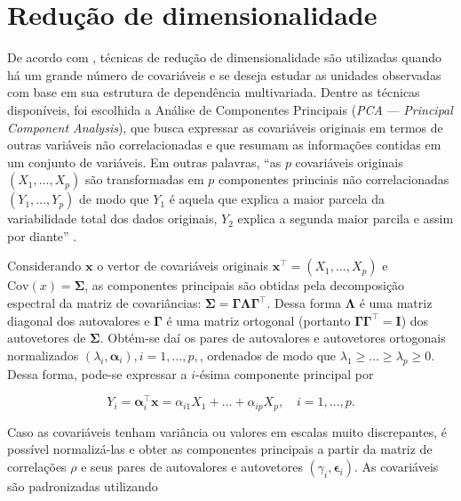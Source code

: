\documentclass[12pt, a4paper, twoside]{report}
\numberwithin{equation}{subsection} %
\begin{document}
 \section{Redução de dimensionalidade}
 
 De acordo com \cite{morettindatasci}, técnicas de redução de dimensionalidade são utilizadas quando há um grande número de covariáveis e se deseja estudar as unidades observadas com base em sua estrutura de dependência multivariada. Dentre as técnicas disponíveis, foi escolhida a Análise de Componentes Principais (\textit{PCA} --- \textit{Principal Component Analysis}), que busca expressar as covariáveis originais em termos de outras variáveis não correlacionadas e que resumam as informações contidas em um conjunto de variáveis. Em outras palavras, ``as $p$ covariáveis originais $(X_1, \dots , X_p)$ são transformadas em $p$ componentes princiais não correlacionadas $(Y_1, \dots, Y_p)$ de modo que $Y_1$ é aquela que explica a maior parcela da variabilidade total dos dados originais, $Y_2$ explica a segunda maior parcila e assim por diante'' \citep{metodosmultivariados_artes}. 
 
Considerando $\mathbf{x}$ o vertor de covariáveis originais $\mathbf{x}^\top = (X_1, \dots, X_p)$ e $\text{Cov}(x) = \boldsymbol{\Sigma}$, as componentes principais são obtidas pela decomposição espectral da matriz de covariâncias: $\boldsymbol{\Sigma} = \boldsymbol{\Gamma \Lambda \Gamma}^\top$. Dessa forma $\boldsymbol{\Lambda}$ é uma matriz diagonal dos autovalores e $\boldsymbol{\Gamma}$ é uma matriz ortogonal (portanto $\boldsymbol{\Gamma \Gamma}^\top = \mathbf{I}$) dos autovetores de $\boldsymbol{\Sigma}$. Obtém-se daí os pares de autovalores e autovetores ortogonais normalizados $(\lambda_i, \boldsymbol{\alpha}_i), i = 1, \dots, p,$, ordenados de modo que $\lambda_1 \geq \dots \geq \lambda_p \geq 0$. Dessa forma, pode-se expressar a $i$-ésima componente principal por

\begin{equation}
	Y_i = \boldsymbol{\alpha}_i^\top \mathbf{x} = \alpha_{i1}X_1 + \dots + \alpha_{ip}X_p, \quad i = 1, \dots , p.
\end{equation}

Caso as covariáveis tenham variância ou valores em escalas muito discrepantes, é possível normalizá-las e obter as componentes principais a partir da matriz de correlações $\rho$ e seus pares de autovalores e autovetores $(\gamma_i, \boldsymbol{\epsilon}_i)$. As covariáveis são padronizadas utilizando
\end{document}
